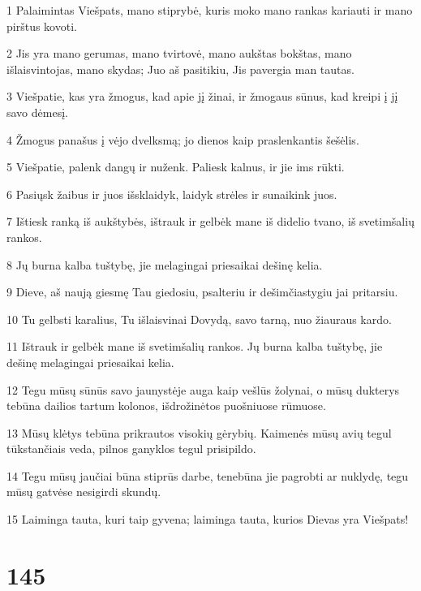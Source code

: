 \par 1 Palaimintas Viešpats, mano stiprybė, kuris moko mano rankas kariauti ir mano pirštus kovoti. 
\par 2 Jis yra mano gerumas, mano tvirtovė, mano aukštas bokštas, mano išlaisvintojas, mano skydas; Juo aš pasitikiu, Jis pavergia man tautas. 
\par 3 Viešpatie, kas yra žmogus, kad apie jį žinai, ir žmogaus sūnus, kad kreipi į jį savo dėmesį. 
\par 4 Žmogus panašus į vėjo dvelksmą; jo dienos kaip praslenkantis šešėlis. 
\par 5 Viešpatie, palenk dangų ir nuženk. Paliesk kalnus, ir jie ims rūkti. 
\par 6 Pasiųsk žaibus ir juos išsklaidyk, laidyk strėles ir sunaikink juos. 
\par 7 Ištiesk ranką iš aukštybės, ištrauk ir gelbėk mane iš didelio tvano, iš svetimšalių rankos. 
\par 8 Jų burna kalba tuštybę, jie melagingai priesaikai dešinę kelia. 
\par 9 Dieve, aš naują giesmę Tau giedosiu, psalteriu ir dešimčiastygiu jai pritarsiu. 
\par 10 Tu gelbsti karalius, Tu išlaisvinai Dovydą, savo tarną, nuo žiauraus kardo. 
\par 11 Ištrauk ir gelbėk mane iš svetimšalių rankos. Jų burna kalba tuštybę, jie dešinę melagingai priesaikai kelia. 
\par 12 Tegu mūsų sūnūs savo jaunystėje auga kaip vešlūs žolynai, o mūsų dukterys tebūna dailios tartum kolonos, išdrožinėtos puošniuose rūmuose. 
\par 13 Mūsų klėtys tebūna prikrautos visokių gėrybių. Kaimenės mūsų avių tegul tūkstančiais veda, pilnos ganyklos tegul prisipildo. 
\par 14 Tegu mūsų jaučiai būna stiprūs darbe, tenebūna jie pagrobti ar nuklydę, tegu mūsų gatvėse nesigirdi skundų. 
\par 15 Laiminga tauta, kuri taip gyvena; laiminga tauta, kurios Dievas yra Viešpats!


\chapter{145}


